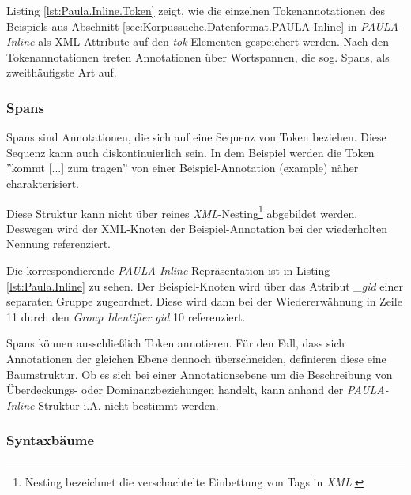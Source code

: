 Listing \ref{lst:Paula.Inline.Token} zeigt, wie die einzelnen Tokenannotationen des Beispiels aus Abschnitt \ref{sec:Korpussuche.Datenformat.PAULA-Inline} in \emph{PAULA-Inline} als XML-Attribute auf den \emph{tok}-Elementen gespeichert werden. Nach den Tokenannotationen treten Annotationen über Wortspannen, die sog. Spans, als zweithäufigste Art auf.

\subsubsection{Spans}

Spans sind Annotationen, die sich auf eine Sequenz von Token beziehen. Diese Sequenz kann auch diskontinuierlich sein. In dem Beispiel werden die Token ''kommt [...] zum tragen'' von einer Beispiel-Annotation (example) näher charakterisiert.

Diese Struktur kann nicht über reines \emph{XML}-Nesting\footnote{Nesting bezeichnet die verschachtelte Einbettung von Tags in \emph{XML}.} abgebildet werden. Deswegen wird der XML-Knoten der Beispiel-Annotation bei der wiederholten Nennung referenziert.

\newpage
{}



Die korrespondierende \emph{PAULA-Inline}-Repräsentation ist in Listing \ref{lst:Paula.Inline} zu sehen. Der Beispiel-Knoten wird über das Attribut \emph{\_gid} einer separaten Gruppe zugeordnet. Diese wird dann bei der Wiedererwähnung in Zeile 11 durch den \emph{Group Identifier gid} 10 referenziert.

Spans können ausschließlich Token annotieren. Für den Fall, dass sich Annotationen der gleichen Ebene dennoch überschneiden, definieren diese eine Baumstruktur. Ob es sich bei einer Annotationsebene um die Beschreibung von Überdeckungs- oder Dominanzbeziehungen handelt, kann anhand der \emph{PAULA-Inline}-Struktur i.A. nicht bestimmt werden.

\subsubsection{Syntaxbäume}

